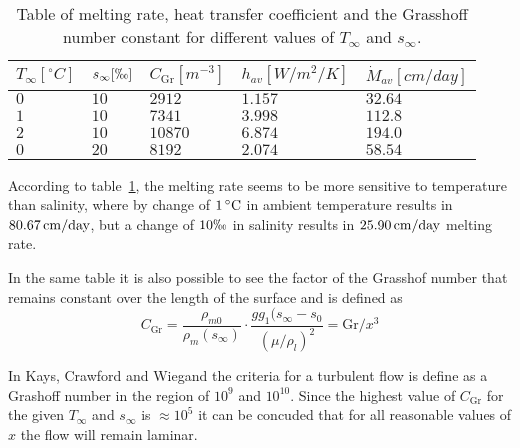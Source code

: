 	\begin{table}
	  \centering
	  \begin{tabular}{lllll}
	    $T_\infty [\unit{^\circ C}]$ & $s_\infty [\permil]$ & $C_{\text{Gr}} [\unit{m^{-3}}]$ & $h_{av} [\unit{W/m^2/K}]$ & $\dot{M}_{av} [\unit{cm/day}]$ \\
	    \hline
	    $0$ & $10$ & $2912$ & $1.157$ & $32.64$ \\
	    $1$ & $10$ & $7341$ & $3.998$ & $112.8$ \\
	    $2$ & $10$ & $10870$ & $6.874$ & $194.0$ \\
	    $0$ & $20$ & $8192$ & $2.074$ & $58.54$ \\
	    \hline
	  \end{tabular}
	  \caption{Table of melting rate, heat transfer coefficient and the Grasshoff number constant for different values of $T_\infty$ and $s_\infty$.}
	  \label{tab:thermRes}
	\end{table}

	According to table~\ref{tab:thermRes}, the melting rate seems to be more sensitive to temperature than salinity, where by change of $ \unit[1]{^\circ C}$ in ambient temperature results in $\unit[80.67]{cm/day}$, but a change of $10 \permil$ in salinity results in $\unit[25.90]{cm/day}$ melting rate.

	In the same table it is also possible to see the factor of the Grasshof number that remains constant over the length of the surface and is defined as
	\begin{equation*}
	  C_{\text{Gr}}= \frac{\rho_{m0}}{\rho_{m}(s_{\infty})}\cdot \frac{g g_1 (s_{\infty}-s_0}{(\mu/\rho_l)^2} = \text{Gr}/x^3
	\end{equation*}

	In Kays, Crawford and Wiegand the criteria for a turbulent flow is define as a Grashoff number in the region of $10^9$ and $10^10$. Since the highest value of $C_{\text{Gr}}$ for the given $T_{\infty}$ and $s_{\infty}$ is $\approx 10^5$ it can be concuded that for all reasonable values of $x$ the flow will remain laminar.




